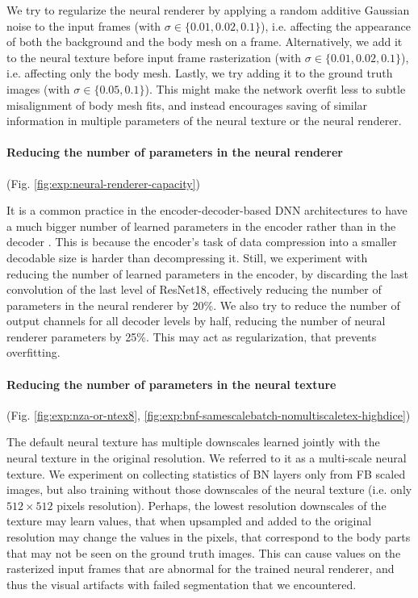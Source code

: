 We try to regularize the neural renderer by applying a random additive Gaussian noise to the input frames (with $\sigma\in\{0.01, 0.02, 0.1\}$), i.e. affecting the appearance of both the background and the body mesh on a frame. Alternatively, we add it to the neural texture before input frame rasterization (with $\sigma\in\{0.01, 0.02, 0.1\}$), i.e. affecting only the body mesh. Lastly, we try adding it to the ground truth images (with $\sigma\in\{0.05, 0.1\}$). This might make the network overfit less to subtle misalignment of body mesh fits, and instead encourages saving of similar information in multiple parameters of the neural texture or the neural renderer.

\vspace{-15pt}\paragraph{Reducing the number of parameters in the neural renderer}(Fig. \ref{fig:exp:neural-renderer-capacity})\mbox{}\nopagebreak

It is a common practice in the encoder-decoder-based DNN architectures to have a much bigger number of learned parameters in the encoder rather than in the decoder \cite{dnn:resnet-unet20, dnn:relightable-pointcloud20, dnn:neuralpointgraphics20}. This is because the encoder's task of data compression into a smaller decodable size is harder than decompressing it. Still, we experiment with reducing the number of learned parameters in the encoder, by discarding the last convolution of the last level of ResNet18, effectively reducing the number of parameters in the neural renderer by 20\%. We also try to reduce the number of output channels for all decoder levels by half, reducing the number of neural renderer parameters by 25\%. This may act as regularization, that prevents overfitting.

\vspace{-15pt}\paragraph{Reducing the number of parameters in the neural texture}(Fig. \ref{fig:exp:nza-or-ntex8}, \ref{fig:exp:bnf-samescalebatch-nomultiscaletex-highdice})\mbox{}\nopagebreak

The default neural texture has multiple downscales learned jointly with the neural texture in the original resolution. We referred to it as a multi-scale neural texture. We experiment on collecting statistics of BN layers only from FB scaled images, but also training without those downscales of the neural texture (i.e. only $512 \times 512$ pixels resolution). Perhaps, the lowest resolution downscales of the texture may learn values, that when upsampled and added to the original resolution may change the values in the pixels, that correspond to the body parts that may not be seen on the ground truth images. This can cause values on the rasterized input frames that are abnormal for the trained neural renderer, and thus the visual artifacts with failed segmentation that we encountered.

